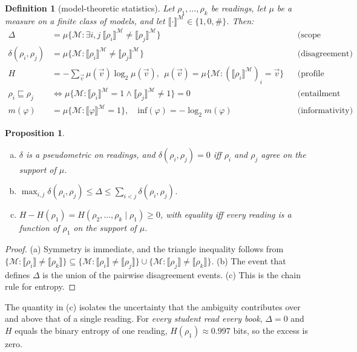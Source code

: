 \documentclass[11pt,a4paper]{article}
\newcommand{\den}[1]{\llbracket #1\rrbracket}
\newtheorem{definition}{Definition}
\newtheorem{proposition}{Proposition}
\theoremstyle{definition}
\begin{document}
\begin{definition}[model-theoretic statistics]\label{def:stats}
Let $\rho_1,\dots,\rho_k$ be readings, let $\mu$ be a measure on a finite class of models, and let $\den{\cdot}^{\mathcal M}\in\{1,0,\#\}$. Then:
\begin{align*}
\Delta&=\mu\{\mathcal{M}:\exists i,j\ \den{\rho_i}^{\mathcal{M}}\neq\den{\rho_j}^{\mathcal{M}}\} && \text{(scope sensitivity)}\\
\delta(\rho_i,\rho_j)&=\mu\{\mathcal{M}:\den{\rho_i}^{\mathcal{M}}\neq\den{\rho_j}^{\mathcal{M}}\} && \text{(disagreement)}\\
H&=-\textstyle\sum_{\vec v}\mu(\vec v)\log_2\mu(\vec v),\ \ \mu(\vec v)=\mu\{\mathcal{M}:(\den{\rho_i}^{\mathcal{M}})_i=\vec v\} && \text{(profile entropy)}\\
\rho_i\sqsubseteq\rho_j&\iff\mu\{\mathcal{M}:\den{\rho_i}^{\mathcal{M}}=1\wedge\den{\rho_j}^{\mathcal{M}}\neq1\}=0 && \text{(entailment preorder)}\\
m(\varphi)&=\mu\{\mathcal{M}:\den{\varphi}^{\mathcal{M}}=1\},\quad \mathrm{inf}(\varphi)=-\log_2 m(\varphi) && \text{(informativity)}
\end{align*}
\end{definition}

\begin{proposition}\label{prop:stats}
\begin{enumerate}[(a)]
\item $\delta$ is a pseudometric on readings, and $\delta(\rho_i,\rho_j)=0$ iff $\rho_i$ and $\rho_j$ agree on the support of $\mu$.
\item $\max_{i,j}\delta(\rho_i,\rho_j)\le\Delta\le\sum_{i<j}\delta(\rho_i,\rho_j)$.
\item $H-H(\rho_1)=H(\rho_2,\dots,\rho_k\mid\rho_1)\ge0$, with equality iff every reading is a function of $\rho_1$ on the support of $\mu$.
\end{enumerate}
\end{proposition}
\begin{proof}
(a) Symmetry is immediate, and the triangle inequality follows from $\{\mathcal{M}:\den{\rho_i}\neq\den{\rho_k}\}\subseteq\{\mathcal{M}:\den{\rho_i}\neq\den{\rho_j}\}\cup\{\mathcal{M}:\den{\rho_j}\neq\den{\rho_k}\}$. (b) The event that defines $\Delta$ is the union of the pairwise disagreement events. (c) This is the chain rule for entropy.
\end{proof}

\noindent The quantity in (c) isolates the uncertainty that the ambiguity contributes over and above that of a single reading. For \textit{every student read every book}, $\Delta=0$ and $H$ equals the binary entropy of one reading, $H(\rho_1)\approx0.997$ bits, so the excess is zero.
\end{document}
